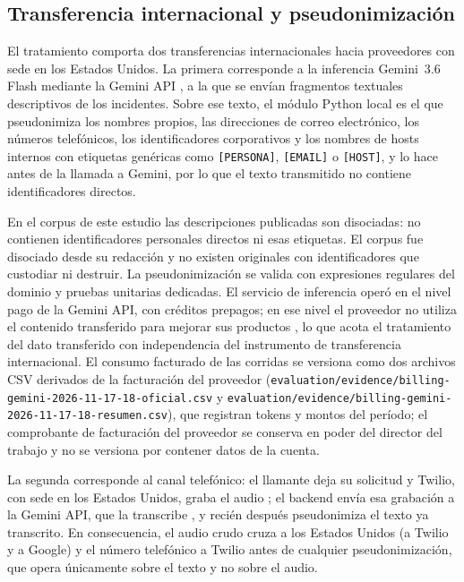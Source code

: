 \subsection{Transferencia internacional y pseudonimización}\label{subsec:transferencia-internacional}

El tratamiento comporta dos transferencias internacionales hacia proveedores con sede en los Estados Unidos. La primera corresponde a la inferencia Gemini~3.6 Flash mediante la Gemini API \parencite{Google2026_gemini_api_terms}, a la que se envían fragmentos textuales descriptivos de los incidentes. Sobre ese texto, el módulo Python local es el que pseudonimiza los nombres propios, las direcciones de correo electrónico, los números telefónicos, los identificadores corporativos y los nombres de hosts internos con etiquetas genéricas como \texttt{[PERSONA]}, \texttt{[EMAIL]} o \texttt{[HOST]}, y lo hace antes de la llamada a Gemini, por lo que el texto transmitido no contiene identificadores directos.

En el corpus de este estudio las descripciones publicadas son disociadas: no contienen identificadores personales directos ni esas etiquetas. El corpus fue disociado desde su redacción y no existen originales con identificadores que custodiar ni destruir. La pseudonimización se valida con expresiones regulares del dominio y pruebas unitarias dedicadas. El servicio de inferencia operó en el nivel pago de la Gemini API, con créditos prepagos; en ese nivel el proveedor no utiliza el contenido transferido para mejorar sus productos \parencite{Google2026_gemini_api_pricing}, lo que acota el tratamiento del dato transferido con independencia del instrumento de transferencia internacional. El consumo facturado de las corridas se versiona como dos archivos CSV derivados de la facturación del proveedor (\texttt{evaluation/evidence/billing-gemini-2026-11-17-18-oficial.csv} y \texttt{evaluation/evidence/billing-gemini-2026-11-17-18-resumen.csv}), que registran tokens y montos del período; el comprobante de facturación del proveedor se conserva en poder del director del trabajo y no se versiona por contener datos de la cuenta.

La segunda corresponde al canal telefónico: el llamante deja su solicitud y Twilio, con sede en los Estados Unidos, graba el audio \parencite{Twilio2026_programmable_voice}; el backend envía esa grabación a la Gemini API, que la transcribe \parencite{Google2026_gemini_audio}, y recién después pseudonimiza el texto ya transcrito. En consecuencia, el audio crudo cruza a los Estados Unidos (a Twilio y a Google) y el número telefónico a Twilio antes de cualquier pseudonimización, que opera únicamente sobre el texto y no sobre el audio.

